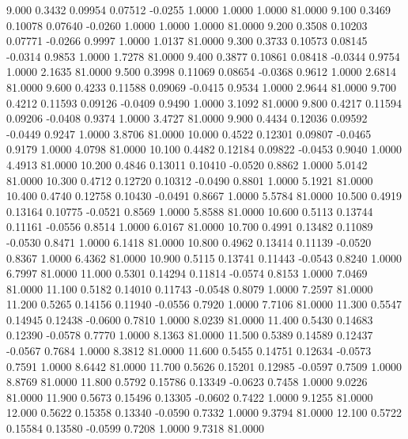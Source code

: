    9.000   0.3432   0.09954   0.07512  -0.0255   1.0000   1.0000   1.0000  81.0000
   9.100   0.3469   0.10078   0.07640  -0.0260   1.0000   1.0000   1.0000  81.0000
   9.200   0.3508   0.10203   0.07771  -0.0266   0.9997   1.0000   1.0137  81.0000
   9.300   0.3733   0.10573   0.08145  -0.0314   0.9853   1.0000   1.7278  81.0000
   9.400   0.3877   0.10861   0.08418  -0.0344   0.9754   1.0000   2.1635  81.0000
   9.500   0.3998   0.11069   0.08654  -0.0368   0.9612   1.0000   2.6814  81.0000
   9.600   0.4233   0.11588   0.09069  -0.0415   0.9534   1.0000   2.9644  81.0000
   9.700   0.4212   0.11593   0.09126  -0.0409   0.9490   1.0000   3.1092  81.0000
   9.800   0.4217   0.11594   0.09206  -0.0408   0.9374   1.0000   3.4727  81.0000
   9.900   0.4434   0.12036   0.09592  -0.0449   0.9247   1.0000   3.8706  81.0000
  10.000   0.4522   0.12301   0.09807  -0.0465   0.9179   1.0000   4.0798  81.0000
  10.100   0.4482   0.12184   0.09822  -0.0453   0.9040   1.0000   4.4913  81.0000
  10.200   0.4846   0.13011   0.10410  -0.0520   0.8862   1.0000   5.0142  81.0000
  10.300   0.4712   0.12720   0.10312  -0.0490   0.8801   1.0000   5.1921  81.0000
  10.400   0.4740   0.12758   0.10430  -0.0491   0.8667   1.0000   5.5784  81.0000
  10.500   0.4919   0.13164   0.10775  -0.0521   0.8569   1.0000   5.8588  81.0000
  10.600   0.5113   0.13744   0.11161  -0.0556   0.8514   1.0000   6.0167  81.0000
  10.700   0.4991   0.13482   0.11089  -0.0530   0.8471   1.0000   6.1418  81.0000
  10.800   0.4962   0.13414   0.11139  -0.0520   0.8367   1.0000   6.4362  81.0000
  10.900   0.5115   0.13741   0.11443  -0.0543   0.8240   1.0000   6.7997  81.0000
  11.000   0.5301   0.14294   0.11814  -0.0574   0.8153   1.0000   7.0469  81.0000
  11.100   0.5182   0.14010   0.11743  -0.0548   0.8079   1.0000   7.2597  81.0000
  11.200   0.5265   0.14156   0.11940  -0.0556   0.7920   1.0000   7.7106  81.0000
  11.300   0.5547   0.14945   0.12438  -0.0600   0.7810   1.0000   8.0239  81.0000
  11.400   0.5430   0.14683   0.12390  -0.0578   0.7770   1.0000   8.1363  81.0000
  11.500   0.5389   0.14589   0.12437  -0.0567   0.7684   1.0000   8.3812  81.0000
  11.600   0.5455   0.14751   0.12634  -0.0573   0.7591   1.0000   8.6442  81.0000
  11.700   0.5626   0.15201   0.12985  -0.0597   0.7509   1.0000   8.8769  81.0000
  11.800   0.5792   0.15786   0.13349  -0.0623   0.7458   1.0000   9.0226  81.0000
  11.900   0.5673   0.15496   0.13305  -0.0602   0.7422   1.0000   9.1255  81.0000
  12.000   0.5622   0.15358   0.13340  -0.0590   0.7332   1.0000   9.3794  81.0000
  12.100   0.5722   0.15584   0.13580  -0.0599   0.7208   1.0000   9.7318  81.0000
